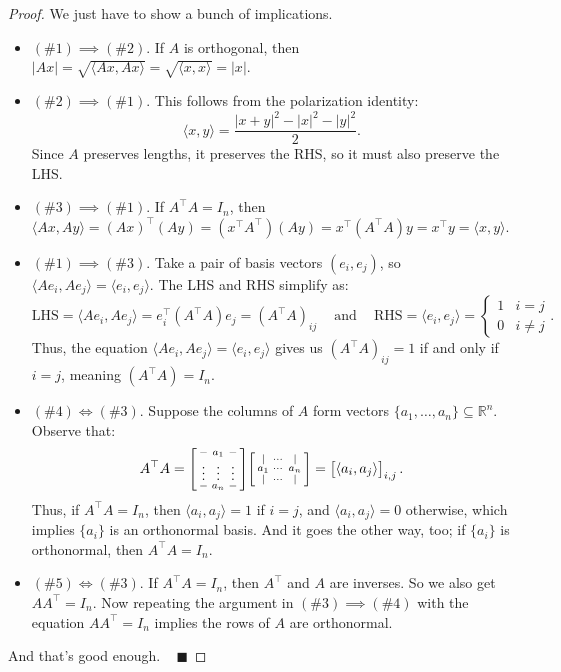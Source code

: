 \begin{proof}
    We just have to show a bunch of implications.
    \begin{itemize}
        \item $(\#1) \implies (\#2)$.  If $A$ is orthogonal, then $|Ax| = \sqrt{\langle Ax, Ax \rangle} = \sqrt{\langle x, x \rangle} = |x|$.
        \item $(\#2) \implies (\#1)$.  This follows from the polarization identity:
        \[ \langle x, y \rangle = \dfrac{|x + y|^2 - |x|^2 - |y|^2}{2}. \]
        Since $A$ preserves lengths, it preserves the RHS, so it must also preserve the LHS.
        \item $(\#3) \implies (\#1)$.  If $A^{\top}A = I_n$, then $\langle Ax, Ay \rangle = (Ax)^{\top}(Ay) = (x^{\top}A^{\top})(Ay) = x^{\top}(A^{\top}A)y = x^{\top}y = \langle x, y \rangle$.
        \item $(\#1) \implies (\#3)$.  Take a pair of basis vectors $(e_i, e_j)$, so $\langle Ae_i, Ae_j\rangle = \langle e_i, e_j \rangle$.  The LHS and RHS simplify as:
        \[ \text{LHS} = \langle Ae_i, Ae_j \rangle = e_i^{\top}(A^{\top}A)e_j = (A^{\top}A)_{ij} ~~~~ \text{ and } ~~~~ \text{RHS} = \langle e_i, e_j \rangle = \begin{cases} 1 & i = j \\ 0 & i \neq j \end{cases}. \]
        Thus, the equation $\langle Ae_i, Ae_j\rangle = \langle e_i, e_j \rangle$ gives us $(A^{\top}A)_{ij} = 1$ if and only if $i = j$, meaning $(A^{\top}A) = I_n$.
        \item $(\#4) \iff (\#3)$.  Suppose the columns of $A$ form vectors $\{a_1, \dots, a_n\} \subseteq \mathbb{R}^n$.  Observe that:
        \[ A^{\top}A = \begin{bsmallmatrix} - & a_1 & - \\ \vdots & \vdots & \vdots \\ - & a_n & - \end{bsmallmatrix} \begin{bsmallmatrix} \mid & \cdots & \mid \\ a_1 & \cdots & a_n \\ \mid & \cdots & \mid \end{bsmallmatrix} = \begin{bmatrix} \langle a_i, a_j \rangle \end{bmatrix}_{i, j}. \]
        Thus, if $A^{\top}A = I_n$, then $\langle a_i, a_j \rangle = 1$ if $i = j$, and $\langle a_i, a_j \rangle = 0$ otherwise, which implies $\{a_i\}$ is an orthonormal basis.  And it goes the other way, too; if $\{a_i\}$ is orthonormal, then $A^{\top}A = I_n$.
        \item $(\# 5) \iff (\#3)$. If $A^{\top} A = I_n$, then $A^{\top}$ and $A$ are inverses.  So we also get $A A^{\top} = I_n$.  Now repeating the argument in $(\#3) \implies (\#4)$ with the equation $AA^{\top} = I_n$ implies the rows of $A$ are orthonormal.
    \end{itemize}
    And that's good enough. ~ $\blacksquare$
\end{proof}


